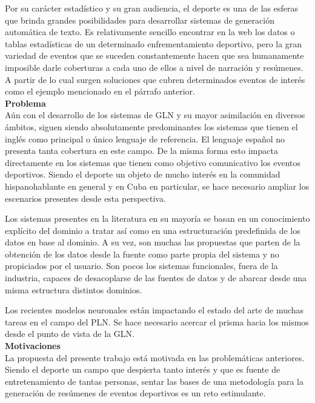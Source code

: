     Por su carácter estadístico y su gran audiencia, el deporte es una de las esferas que brinda grandes posibilidades para desarrollar sistemas 
de generación automática de texto. Es relativamente sencillo encontrar en la web los datos o tablas estadísticas de un determinado enfrementamiento deportivo, 
pero la gran variedad de eventos que se suceden constantemente hacen que sea humanamente imposible darle coberturas a cada uno de ellos a nivel de narración y 
resúmenes. A partir de lo cual surgen soluciones que cubren determinados eventos de interés como el ejemplo mencionado en el párrafo anterior.\\


   \textbf{Problema}\\

    Aún con el desarrollo de los sistemas de GLN y su mayor asimilación en diversos ámbitos, siguen siendo absolutamente predominantes los 
sistemas que tienen el inglés como principal o único lenguaje de referencia. El lenguaje español no presenta tanta cobertura en este 
campo. De la misma forma esto impacta directamente en los sistemas que tienen como objetivo comunicativo los eventos deportivos. Siendo el 
deporte un objeto de mucho interés en la comunidad hispanohablante en general y en Cuba en particular, se hace necesario ampliar los escenarios 
presentes desde esta perspectiva.

    Los sistemas presentes en la literatura en su mayoría se basan en un conocimiento explícito del dominio a tratar así como en una 
estructuración predefinida de los datos en base al dominio. A su vez, son muchas las propuestas que parten de la obtención de los datos desde 
la fuente como parte propia del sistema y no propiciados por el usuario. Son pocos los sistemas funcionales, fuera de la industria, capaces de 
desacoplarse de las fuentes de datos y de abarcar desde una misma estructura distintos dominios.

    Los recientes modelos neuronales están impactando el estado del arte de muchas tareas en el campo del PLN. Se hace necesario 
acercar el prisma hacia los mismos desde el punto de vista de la GLN.\\

    \textbf{Motivaciones}\\

    La propuesta del presente trabajo está motivada en las problemáticas anteriores. Siendo el deporte un campo que despierta tanto 
interés y que es fuente de entretenamiento de tantas personas, sentar las bases de una metodología para la generación de resúmenes de 
eventos deportivos es un reto estimulante.

